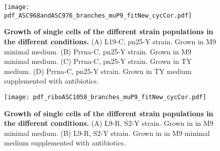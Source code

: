 \begin{figure}
    \centering
    \texttt{[image: pdf\_ASC968andASC976\_branches\_muP9\_fitNew\_cycCor.pdf]}
    \caption{ 
        \textbf{Growth of single cells of the different strain populations in the different conditions.}
        (A) L19-C, pn25-Y strain. Grown in M9 minimal medium.
        (B) Prrna-C, pn25-Y strain. Grown in M9 minimal medium.
        (C) Prrna-C, pn25-Y strain. Grown in TY medium.
        (D) Prrna-C, pn25-Y strain. Grown in TY medium supplemented with antibiotics.
    }
    \label{fig:ribo:branchesASC968andASC976}
\end{figure}



\begin{figure}
    \centering
    \texttt{[image: pdf\_riboASC1058\_branches\_muP9\_fitNew\_cycCor.pdf]}
    \caption{ 
        \textbf{Growth of single cells of the different strain populations in the different conditions.}
        (A) L9-R, S2-Y strain. Grown in in M9 minimal medium.
        (B) L9-R, S2-Y strain. Grown in in M9 minimal medium supplemented with antibiotics. 
    }
    \label{fig:ribo:branchesASC1058}
\end{figure}


